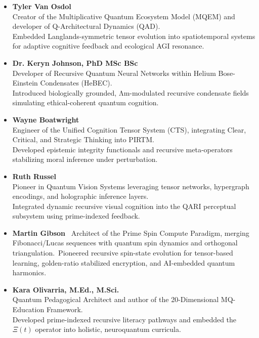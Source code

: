 \documentclass[12pt]{article}
\begin{document}
\begin{itemize}
\item \textbf{Tyler Van Osdol} \cite{vanosdol2025qad}\\
Creator of the Multiplicative Quantum Ecosystem Model (MQEM) and developer of Q-Architectural Dynamics (QAD).\\
Embedded Langlands-symmetric tensor evolution into spatiotemporal systems for adaptive cognitive feedback and ecological AGI resonance.

\item \textbf{Dr. Keryn Johnson, PhD MSc BSc} \cite{johnson2025neuroprime}\\
Developer of Recursive Quantum Neural Networks within Helium Bose-Einstein Condensates (HeBEC).\\
Introduced biologically grounded, Λm-modulated recursive condensate fields simulating ethical-coherent quantum cognition.

\item \textbf{Wayne Boatwright} \cite{boatright2025recursive}\\
Engineer of the Unified Cognition Tensor System (CTS), integrating Clear, Critical, and Strategic Thinking into PIRTM.\\
Developed epistemic integrity functionals and recursive meta-operators stabilizing moral inference under perturbation.

\item \textbf{Ruth Russel} \cite{russel2025vision}\\
Pioneer in Quantum Vision Systems leveraging tensor networks, hypergraph encodings, and holographic inference layers.\\
Integrated dynamic recursive visual cognition into the QARI perceptual subsystem using prime-indexed feedback.

\item \textbf{Martin Gibson} \cite{gibson2024naturals}\
Architect of the Prime Spin Compute Paradigm, merging Fibonacci/Lucas sequences with quantum spin dynamics and orthogonal triangulation.\
Pioneered recursive spin-state evolution for tensor-based learning, golden-ratio stabilized encryption, and AI-embedded quantum harmonics.

\item \textbf{Kara Olivarria, M.Ed., M.Sci.} \cite{olivarria2025mqed}\\
Quantum Pedagogical Architect and author of the 20-Dimensional MQ-Education Framework.\\
Developed prime-indexed recursive literacy pathways and embedded the $\Xi(t)$ operator into holistic, neuroquantum curricula.


\end{itemize}
\end{document}
